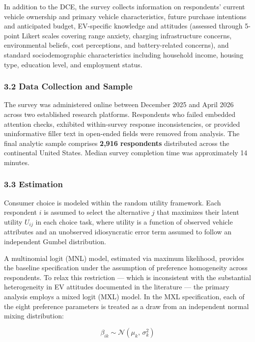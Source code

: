 \documentclass[
  letterpaper,
  DIV=11,
  numbers=noendperiod]{scrartcl}
\begin{document}
In addition to the DCE, the survey collects information on respondents'
current vehicle ownership and primary vehicle characteristics, future
purchase intentions and anticipated budget, EV-specific knowledge and
attitudes (assessed through 5-point Likert scales covering range
anxiety, charging infrastructure concerns, environmental beliefs, cost
perceptions, and battery-related concerns), and standard
sociodemographic characteristics including household income, housing
type, education level, and employment status.

\subsubsection{3.2 Data Collection and
Sample}\label{data-collection-and-sample}

The survey was administered online between December 2025 and April 2026
across two established research platforms. Respondents who failed
embedded attention checks, exhibited within-survey response
inconsistencies, or provided uninformative filler text in open-ended
fields were removed from analysis. The final analytic sample comprises
\textbf{2,916 respondents} distributed across the continental United
States. Median survey completion time was approximately 14 minutes.

\subsubsection{3.3 Estimation}\label{estimation}

Consumer choice is modeled within the random utility framework. Each
respondent \(i\) is assumed to select the alternative \(j\) that
maximizes their latent utility \(U_{ij}\) in each choice task, where
utility is a function of observed vehicle attributes and an unobserved
idiosyncratic error term assumed to follow an independent Gumbel
distribution.

A multinomial logit (MNL) model, estimated via maximum likelihood,
provides the baseline specification under the assumption of preference
homogeneity across respondents. To relax this restriction --- which is
inconsistent with the substantial heterogeneity in EV attitudes
documented in the literature --- the primary analysis employs a mixed
logit (MXL) model. In the MXL specification, each of the eight
preference parameters is treated as a draw from an independent normal
mixing distribution:

\[\beta_{ik} \sim \mathcal{N}(\mu_k,\, \sigma_k^2)\]
\end{document}
